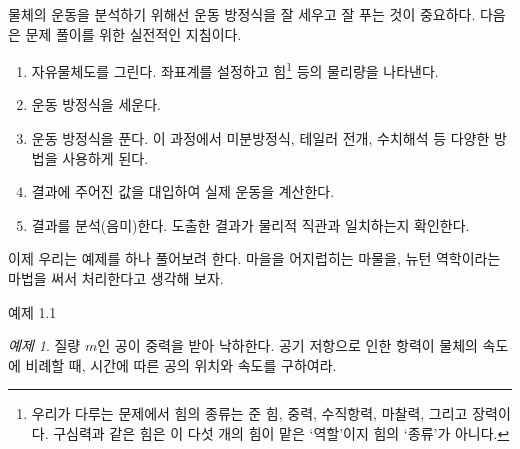 \documentclass[chapter, oneside, b5paper]{oblivoir}
\theoremstyle{plain}
\theoremstyle{definition}
\theoremstyle{remark}
\newtheorem{example}{예제}[chapter]    %
\begin{document}
물체의 운동을 분석하기 위해선 운동 방정식을 잘 세우고 잘 푸는 것이 중요하다. 다음은 문제 풀이를 위한 실전적인 지침이다.

\begin{enumerate}
    \item 자유물체도를 그린다. 좌표계를 설정하고 힘\footnote{우리가 다루는 문제에서 힘의 종류는 준 힘, 중력, 수직항력, 마찰력, 그리고 장력이다. 구심력과 같은 힘은 이 다섯 개의 힘이 맡은 `역할'이지 힘의 `종류'가 아니다.} 등의 물리량을 나타낸다.
    \item 운동 방정식을 세운다.
    \item 운동 방정식을 푼다. 이 과정에서 미분방정식, 테일러 전개, 수치해석 등 다양한 방법을 사용하게 된다.
    \item 결과에 주어진 값을 대입하여 실제 운동을 계산한다.
    \item 결과를 분석(음미)한다. 도출한 결과가 물리적 직관과 일치하는지 확인한다.
\end{enumerate}

이제 우리는 예제를 하나 풀어보려 한다. 마을을 어지럽히는 마물을, 뉴턴 역학이라는 마법을 써서 처리한다고 생각해 보자.

\begin{examplebox}{예제 1.1}
\begin{example}
질량 $m$인 공이 중력을 받아 낙하한다. 공기 저항으로 인한 항력이 물체의 속도에 비례할 때, 시간에 따른 공의 위치와 속도를 구하여라.   
\end{example}
\end{examplebox}
\end{document}
